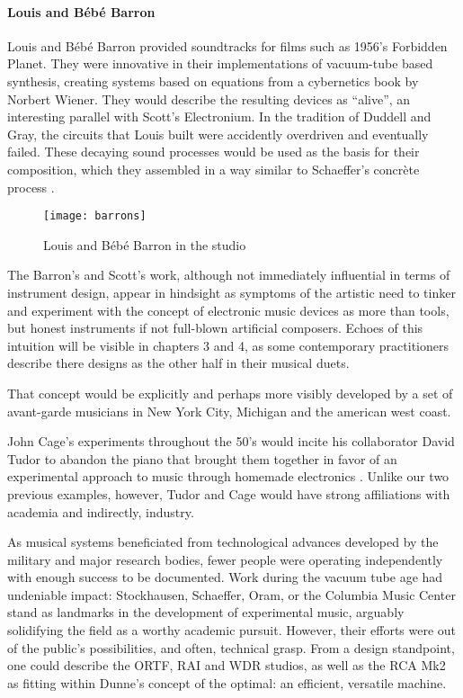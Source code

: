 \begin{itemize}
\paragraph{Louis and Bébé Barron}

Louis and Bébé Barron provided soundtracks for films such as 1956’s Forbidden Planet. They were innovative in their implementations of vacuum-tube based synthesis, creating systems based on equations from a cybernetics book by Norbert Wiener. They would describe the resulting devices as ``alive'', an interesting parallel with Scott’s Electronium. In the tradition of Duddell and Gray, the circuits that Louis built were accidently overdriven and eventually failed. These decaying sound processes would be used as the basis for their composition, which they assembled in a way similar to Schaeffer’s concrète process \cite{dunbar2010}.

	\begin{figure}[h!]
	  \caption{Louis and Bébé Barron in the studio}
	  \centering
	    \texttt{[image: barrons]}
	\end{figure} 
	
The Barron's and Scott's work, although not immediately influential in terms of instrument design, appear in hindsight as symptoms of the artistic need to tinker and experiment with the concept of electronic music devices as more than tools, but honest instruments if not full-blown artificial composers. Echoes of this intuition will be visible in chapters 3 and 4, as some contemporary practitioners describe there designs as the other half in their musical duets. 

That concept would be explicitly and perhaps more visibly developed by a set of avant-garde musicians in New York City, Michigan and the american west coast. 

John Cage’s experiments throughout the 50’s would incite his collaborator David Tudor to abandon the piano that brought them together in favor of an experimental approach to music through homemade electronics \cite{holzaepfel1994,collins2004}. Unlike our two previous examples, however, Tudor and Cage would have strong affiliations with academia and indirectly, industry. 

As musical systems beneficiated from technological advances developed by the military and major research bodies, fewer people were operating independently with enough success to be documented. Work during the vacuum tube age had undeniable impact: Stockhausen, Schaeffer, Oram, or the Columbia Music Center stand as landmarks in the development of experimental music, arguably solidifying the field as a worthy academic pursuit. However, their efforts were out of the public's possibilities, and often, technical grasp. From a design standpoint, one could describe the ORTF, RAI and WDR studios, as well as the RCA Mk2 as fitting within Dunne's concept of the optimal: an efficient, versatile machine. 


\end{itemize}
